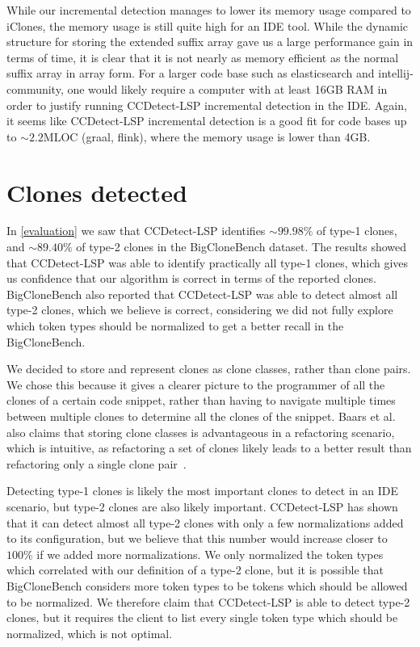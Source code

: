 While our incremental detection manages to lower its memory usage compared to iClones, the
memory usage is still quite high for an IDE tool. While the dynamic structure for storing
the extended suffix array gave us a large performance gain in terms of time, it is clear
that it is not nearly as memory efficient as the normal suffix array in array form. For a
larger code base such as elasticsearch and intellij-community, one would likely require a
computer with at least 16GB RAM in order to justify running CCDetect-LSP incremental
detection in the IDE. Again, it seems like CCDetect-LSP incremental detection is a good
fit for code bases up to ${\sim}2.2\text{MLOC}$ (graal, flink), where the memory usage is lower
than 4GB.

\section{Clones detected}

In \cref{evaluation} we saw that CCDetect-LSP identifies ${\sim}99.98\%$ of type-1 clones,
and ${\sim}89.40\%$ of type-2 clones in the BigCloneBench dataset. The results showed that
CCDetect-LSP was able to identify practically all type-1 clones, which gives us confidence
that our algorithm is correct in terms of the reported clones. BigCloneBench also reported
that CCDetect-LSP was able to detect almost all type-2 clones, which we believe is
correct, considering we did not fully explore which token types should be normalized to
get a better recall in the BigCloneBench. 

We decided to store and represent clones as clone classes, rather than clone pairs. We
chose this because it gives a clearer picture to the programmer of all the clones of a
certain code snippet, rather than having to navigate multiple times between multiple
clones to determine all the clones of the snippet. Baars et al. also claims that storing
clone classes is advantageous in a refactoring scenario, which is intuitive, as
refactoring a set of clones likely leads to a better result than refactoring only a single
clone pair~\cite{TowardsAutomatedRefactoring}.

Detecting type-1 clones is likely the most important clones to detect in an IDE scenario,
but type-2 clones are also likely important. CCDetect-LSP has shown that it can detect
almost all type-2 clones with only a few normalizations added to its configuration, but we
believe that this number would increase closer to $100\%$ if we added more normalizations.
We only normalized the token types which correlated with our definition of a type-2 clone,
but it is possible that BigCloneBench considers more token types to be tokens which should
be allowed to be normalized. We therefore claim that CCDetect-LSP is able to detect type-2
clones, but it requires the client to list every single token type which should be
normalized, which is not optimal.

